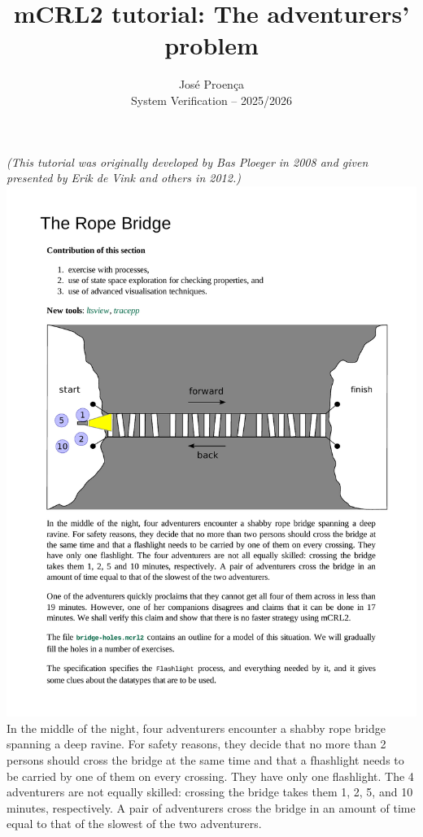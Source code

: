 \documentclass[11pt]{article}
\date{}
\theoremstyle{myplain}
\theoremstyle{definition} %
\begin{document}
 
 
\title{mCRL2 tutorial: The adventurers' problem}
\author{Jos\'{e} Proen\c{c}a\\
System Verification -- 2025/2026}
 
\maketitle

\noindent
\emph{(This tutorial was originally developed by Bas Ploeger in 2008 and given presented by Erik de Vink and others in 2012.)}
\\[5mm]
%
\includegraphics[width=\textwidth]{images/ropebridge-diag}
\\[2mm]

In the middle of the night, four adventurers encounter a shabby rope bridge spanning a deep ravine. For safety reasons, they decide that no more than 2 persons should cross the bridge at the same time and that a fhashlight needs to be carried by one of them on every crossing.
They have only one flashlight. The 4 adventurers are not equally skilled: crossing the bridge takes them 1, 2, 5, and 10 minutes, respectively. A pair of adventurers cross the bridge in an amount of time equal to that of the slowest of the two adventurers.
\end{document}
